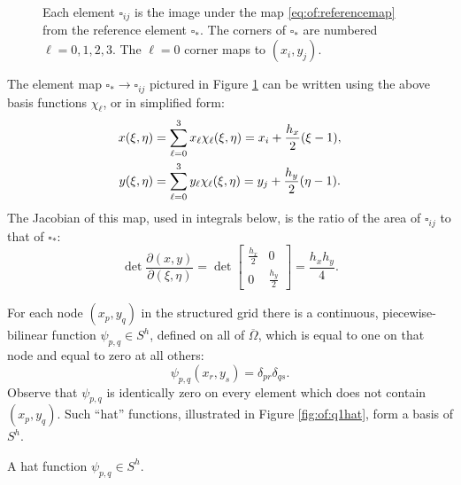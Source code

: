 \begin{figure}

\caption{Each element $\square_{ij}$ is the image under the map \eqref{eq:of:referencemap} from the reference element $\square_\ast$.  The corners of $\square_\ast$ are numbered $\ell=0,1,2,3$.  The $\ell=0$ corner maps to $(x_i,y_j)$.}
\label{fig:of:q1gridandref}
\end{figure}

The element map $\square_\ast \to \square_{ij}$ pictured in Figure \ref{fig:of:q1gridandref} can be written using the above basis functions $\chi_\ell$, or in simplified form:
\begin{align}
x(\xi,\eta) &= \sum_{\ell=0}^3 x_\ell \chi_\ell(\xi,\eta) = x_i + \frac{h_x}{2} (\xi-1), \label{eq:of:referencemap} \\
y(\xi,\eta) &= \sum_{\ell=0}^3 y_\ell \chi_\ell(\xi,\eta) = y_j + \frac{h_y}{2} (\eta-1). \notag
\end{align}
The Jacobian of this map, used in integrals below, is the ratio of the area of $\square_{ij}$ to that of $\square_\ast$:
\begin{equation}
\det\frac{\partial(x,y)}{\partial(\xi,\eta)} = \det\begin{bmatrix} \frac{h_x}{2} & 0 \\ 0 & \frac{h_y}{2} \end{bmatrix} = \frac{h_x h_y}{4}. \label{eq:of:elementjacobian}
\end{equation}

For each node $(x_p,y_q)$ in the structured grid there is a continuous, piecewise-bilinear function $\psi_{p,q} \in S^h$, defined on all of $\overline\Omega$, which is equal to one on that node and equal to zero at all others:
\begin{equation}
  \psi_{p,q}(x_r,y_s) = \delta_{pr} \delta_{qs}.  \label{eq:of:psinodewise}
\end{equation}
Observe that $\psi_{p,q}$ is identically zero on every element which does not contain $(x_p,y_q)$.  Such ``hat'' functions, illustrated in Figure \ref{fig:of:q1hat}, form a basis of $S^h$.

\begin{marginfigure}

\caption{A hat function $\psi_{p,q} \in S^h$.}
\label{fig:of:q1hat}
\end{marginfigure}

